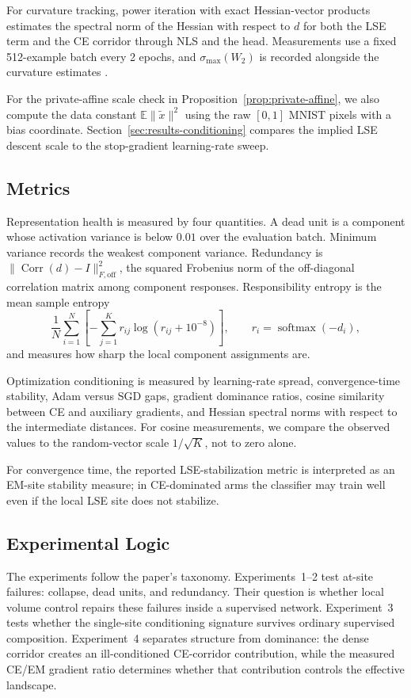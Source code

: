 For curvature tracking, power iteration with exact Hessian-vector products
estimates the spectral norm of the Hessian with respect to $d$ for both the
LSE term and the CE corridor through NLS and the head. Measurements use a
fixed 512-example batch every 2 epochs, and $\sigma_{\max}(W_2)$ is recorded
alongside the curvature estimates \citep{pearlmutter1994fast}.

For the private-affine scale check in Proposition~\ref{prop:private-affine},
we also compute the data constant $\mathbb{E}\|\tilde{x}\|^2$ using the raw
$[0,1]$ MNIST pixels with a bias coordinate.
Section~\ref{sec:results-conditioning} compares the implied LSE descent scale
to the stop-gradient learning-rate sweep.

\subsection{Metrics}
Representation health is measured by four quantities. A dead unit is a
component whose activation variance is below $0.01$ over the evaluation
batch. Minimum variance records the weakest component variance. Redundancy is
$\|\operatorname{Corr}(d)-I\|_{F,\mathrm{off}}^2$, the squared Frobenius norm
of the off-diagonal correlation matrix among component responses.
Responsibility entropy is the mean sample entropy
\[
    \frac{1}{N}\sum_{i=1}^N
    \left[-\sum_{j=1}^K r_{ij}\log(r_{ij}+10^{-8})\right],
    \qquad r_i=\operatorname{softmax}(-d_i),
\]
and measures how sharp the local component assignments are.

Optimization conditioning is measured by learning-rate spread,
convergence-time stability, Adam versus SGD gaps, gradient dominance ratios,
cosine similarity between CE and auxiliary gradients, and Hessian spectral
norms with respect to the intermediate distances. For cosine measurements, we
compare the observed values to the random-vector scale $1/\sqrt{K}$, not to
zero alone.

For convergence time, the reported LSE-stabilization metric is interpreted as
an EM-site stability measure; in CE-dominated arms the classifier may train
well even if the local LSE site does not stabilize.

\subsection{Experimental Logic}
The experiments follow the paper's taxonomy. Experiments~1--2 test at-site
failures: collapse, dead units, and redundancy. Their question is whether
local volume control repairs these failures inside a supervised network.
Experiment~3 tests whether the single-site conditioning signature survives
ordinary supervised composition. Experiment~4 separates structure from
dominance: the dense corridor creates an ill-conditioned CE-corridor
contribution, while the measured CE/EM gradient ratio determines whether that
contribution controls the effective landscape.